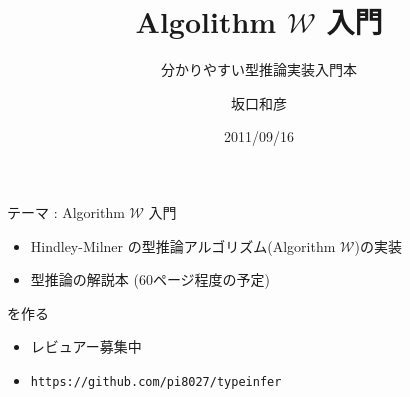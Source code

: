 \documentclass[cjk, 14pt]{beamer}
\title{Algolithm $\mathcal W$ 入門}
\subtitle{分かりやすい型推論実装入門本}
\author{坂口和彦}
\institute{筑波大学 情報学群 情報科学類 B1}
\date{2011/09/16}
\begin{document}
\begin{frame}{テーマ : Algorithm $\mathcal W$ 入門}

 \begin{itemize}
  \item Hindley-Milner の型推論アルゴリズム(Algorithm $\mathcal W$)の実装
  \item 型推論の解説本 (60ページ程度の予定)
 \end{itemize}
 を作る

  \pause

 \begin{itemize}

  \item レビュアー募集中

  \pause

  \item \texttt{https://github.com/pi8027/typeinfer}
 \end{itemize}

\end{frame}
\end{document}
